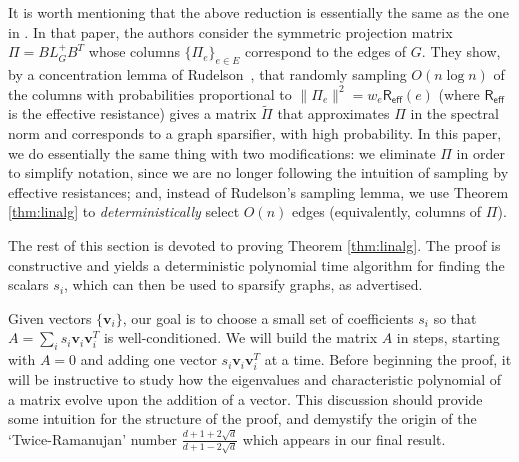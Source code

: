 \documentclass[12pt]{article}
\renewcommand{\v}{\mathbf{v}}
\renewcommand{\v}{\mathbf{v}}
\newcommand\ppi{\mathbf{v}}
\begin{document}
It is worth mentioning that the above reduction is essentially the same as
  the one in \cite{SpielmanSrivastava}. 
In that paper, the authors consider the
  symmetric projection matrix $\Pi = BL^{+}_GB^T$ whose columns $\{\Pi_e\}_{e\in
  E}$
  correspond to the edges of $G$.
They show, by a concentration lemma of Rudelson~\cite{rudl},
  that randomly sampling $O(n\log n)$ of the columns with probabilities proportional to
  $\|\Pi_e\|^2=w_e\mathsf{R_{eff}}(e)$ (where $\mathsf{R_{eff}}$ is the effective
  resistance)
  gives a matrix $\tilde{\Pi}$ that approximates $\Pi$ in the
  spectral norm and corresponds to a graph sparsifier, with high probability.
In this paper, we do essentially the same thing with two modifications:
  we eliminate $\Pi$ in order to simplify notation, since we are no longer
  following the intuition of sampling by effective resistances; and, instead of
  Rudelson's 
  sampling lemma, we use Theorem \ref{thm:linalg} to {\em deterministically}
  select $O(n)$ edges (equivalently, columns of $\Pi$).

The rest of this section is devoted to proving Theorem \ref{thm:linalg}.
The proof is constructive and yields a deterministic polynomial time algorithm for finding the
  scalars $s_i$, which can then be used to sparsify graphs, as advertised.

Given vectors $\{\v_i\}$, our goal is to choose a small set of coefficients $s_i$ so that 
  $A=\sum_i s_i\ppi_{i}\ppi_{i}^{T} $ is well-conditioned. 
We will build the matrix $A$ in steps, starting with $A=0$ and adding one vector
  $s_i\v_i\v_i^T$ at a time. 
Before beginning the proof, it will be instructive to study 
  how the eigenvalues and characteristic polynomial of a matrix evolve upon the addition of a vector.
This discussion should provide some intuition for the structure of the proof, and demystify 
  the origin of the `Twice-Ramanujan' number $\frac{d+1+2\sqrt{d}}{d+1-2\sqrt{d}}$ which 
  appears in our final result.
\end{document}

